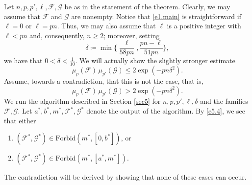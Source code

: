 \documentclass[10pt]{amsart}
\theoremstyle{remark}
\newcommand{\meg}{\geqslant}
\newcommand{\mik}{\leqslant}
\newcommand{\Fcal}{\mathcal{F}}
\newcommand{\Gcal}{\mathcal{G}}
\begin{document}
Let $n,p,p',\ell,\Fcal,\Gcal$ be as in the statement of the theorem. Clearly, we may assume that
$\Fcal$ and $\Gcal$ are nonempty. Notice that \eqref{e1.main} is straightforward if $\ell=0$ or $\ell=pn$.
Thus, we may also assume that $\ell$ is a positive integer with $\ell<pn$ and, consequently, $n\meg 2$;
moreover, setting
\begin{equation} \label{e6.1}
\delta\coloneqq \min\Big\{ \frac{\ell}{58pn}, \frac{pn-\ell}{51 pn}\Big\},
\end{equation}
we have that $0<\delta<\frac{1}{10}$. We will actually show the slightly stronger estimate
\begin{equation} \label{e6.2}
\mu_p(\Fcal)\, \mu_{p'}(\Gcal)\mik 2 \exp(-pn \delta^2).
\end{equation}
Assume, towards a contradiction, that this is not the case, that is,
\begin{equation} \label{e6.3}
\mu_p(\Fcal)\,\mu_{p'}(\Gcal)>2\exp(-pn\delta^2).
\end{equation}
We run the algorithm described in Section \ref{sec5} for $n,p,p',\ell,\delta$ and the families
$\Fcal,\Gcal$. Let $a^*,b^*,m^*,\Fcal^*,\Gcal^*$ denote the output of the algorithm.
By \eqref{e5.4}, we see that either
\begin{enumerate}
\item[($\mathcal{A}1$)] $(\Fcal^*,\Gcal^*)\in\mathrm{Forbid}(m^*,[0,b^*])$, or
\item[($\mathcal{A}2$)] $(\Fcal^*,\Gcal^*)\in\mathrm{Forbid}(m^*,[a^*,m^*])$.
\end{enumerate}
The contradiction will be derived by showing that none of these cases can occur.
\end{document}
